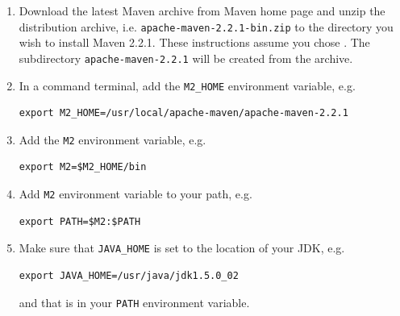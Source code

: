 \begin{enumerate}
    \setlength{\itemsep}{0cm}
    \setlength{\parskip}{0cm}

    \item Download the latest Maven archive from Maven home page and unzip the distribution archive, i.e. \texttt{apache-maven-2.2.1-bin.zip} to the directory you wish to install Maven 2.2.1. These instructions assume you chose . The subdirectory \texttt{apache-maven-2.2.1} will be created from the archive.
    \item In a command terminal, add the \texttt{M2\_HOME} environment variable, e.g.
\begin{verbatim}
export M2_HOME=/usr/local/apache-maven/apache-maven-2.2.1
\end{verbatim}
    \item Add the \texttt{M2} environment variable, e.g. 
\begin{verbatim}
export M2=$M2_HOME/bin
\end{verbatim}
    \item Add \texttt{M2} environment variable to your path, e.g. 
\begin{verbatim}
export PATH=$M2:$PATH
\end{verbatim}
    \item Make sure that \texttt{JAVA\_HOME} is set to the location of your JDK, e.g. 
\begin{verbatim}
export JAVA_HOME=/usr/java/jdk1.5.0_02
\end{verbatim}
and that  is in your \texttt{PATH} environment variable.   
\end{enumerate}
